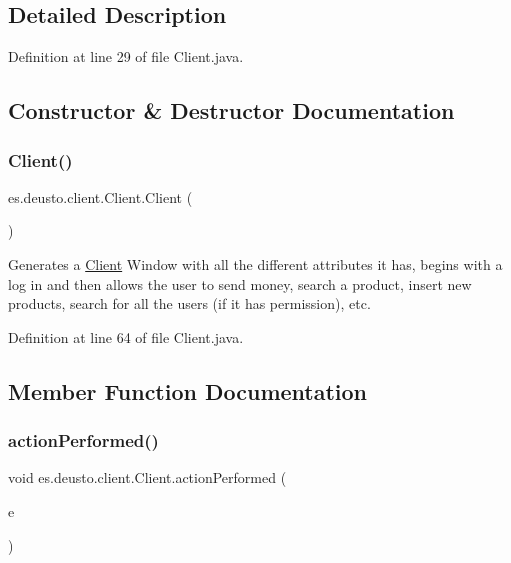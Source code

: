 \subsection{Detailed Description}


Definition at line 29 of file Client.\+java.



\subsection{Constructor \& Destructor Documentation}
\mbox{\label{classes_1_1deusto_1_1client_1_1_client_a71c03e318a72447da873297f3364f67f}} 
\subsubsection{\texorpdfstring{Client()}{Client()}}
{\footnotesize\ttfamily es.\+deusto.\+client.\+Client.\+Client (\begin{DoxyParamCaption}{ }\end{DoxyParamCaption})}

Generates a \hyperlink{classes_1_1deusto_1_1client_1_1_client}{Client} Window with all the different attributes it has, begins with a log in and then allows the user to send money, search a product, insert new products, search for all the users (if it has permission), etc. 

Definition at line 64 of file Client.\+java.



\subsection{Member Function Documentation}
\mbox{\label{classes_1_1deusto_1_1client_1_1_client_a57eb7a5154b4b1559430f90a1c1df852}} 
\subsubsection{\texorpdfstring{action\+Performed()}{actionPerformed()}}
{\footnotesize\ttfamily void es.\+deusto.\+client.\+Client.\+action\+Performed (\begin{DoxyParamCaption}\item[{Action\+Event}]{e }\end{DoxyParamCaption})}



